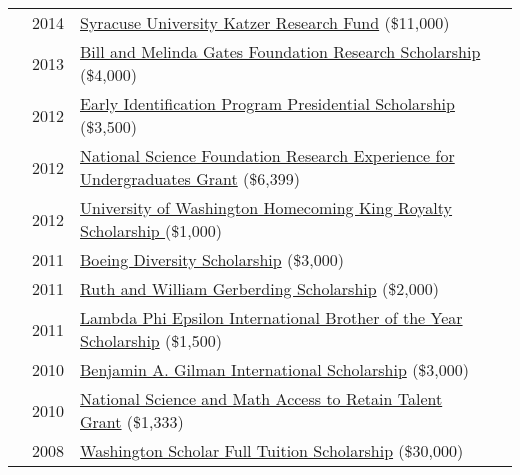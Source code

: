 \documentclass[12pt]{article}
\begin{document}
{{\begin{longtable}{Rp{1.0in}p{0.25in}p{4.75in}}
& \footnotesize{2014} & \href{https://youtu.be/kFmO44rs3-c}{{Syracuse University Katzer Research Fund}} (\$11,000) \\

& \footnotesize{2013} & \href{https://expo.uw.edu/public/offering/271}{{Bill and Melinda Gates Foundation Research Scholarship}} (\$4,000) \\

& \footnotesize{2012} & \href{http://depts.washington.edu/eip/}{{Early Identification Program Presidential Scholarship}} (\$3,500) \\

& \footnotesize{2012} & \href{http://www.nsf.gov/crssprgm/reu/}{{National Science Foundation Research Experience for Undergraduates Grant}} (\$6,399) \\

& \footnotesize{2012} & \href{http://www.washington.edu/uaa/2013/06/28/oh-the-places-theyll-go-new-grads-and-their-plans/bryan-dosono/}{{University of Washington Homecoming King Royalty Scholarship }}(\$1,000) \\

& \footnotesize{2011} & \href{https://ischool.uw.edu/news/2012/04/bryan-dosono-informatics-student-speaks-boeing-scholarship-breakfast}{{Boeing Diversity Scholarship}} (\$3,000) \\

& \footnotesize{2011} & \href{http://www.washington.edu/omad/2011/05/17/assunta-ng-student-scholars-honored-at-41st-annual-eop-celebration/}{{Ruth and William Gerberding Scholarship}} (\$2,000) \\

& \footnotesize{2011} & \href{http://lambdaphiepsilon.com/resources/\#academicachievement}{{Lambda Phi Epsilon International Brother of the Year Scholarship}} (\$1,500) \\

& \footnotesize{2010} & \href{http://depts.washington.edu/uwhonors/news/brief/?id=61}{{Benjamin A. Gilman International Scholarship}} (\$3,000) \\

& \footnotesize{2010} & \href{http://www2.ed.gov/programs/smart/index.html}{{National Science and Math Access to Retain Talent Grant}} (\$1,333) \\

& \footnotesize{2008} & \href{http://www.wsac.wa.gov/}{{Washington Scholar Full Tuition Scholarship}} (\$30,000) \\


\end{longtable}}}
\end{document}
